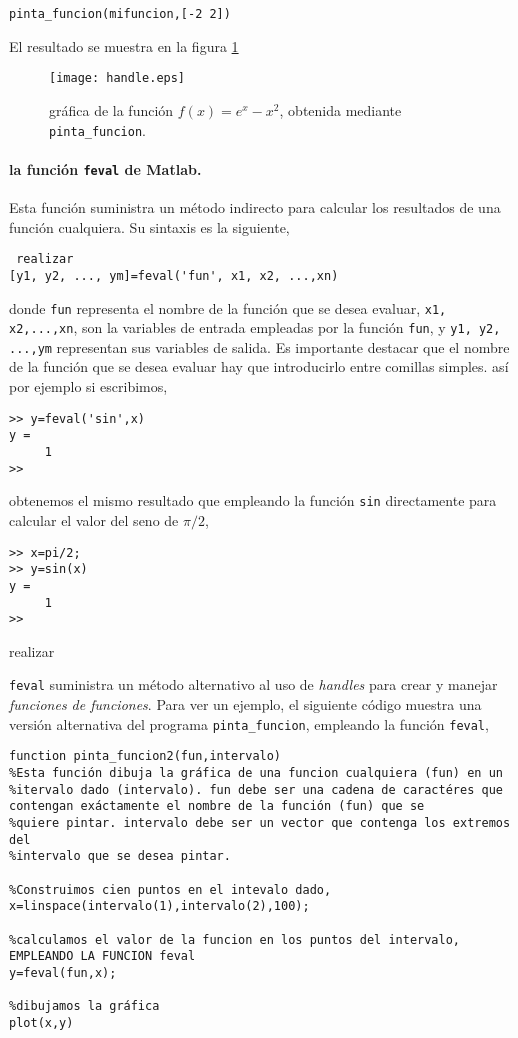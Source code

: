 \begin{verbatim}
pinta_funcion(mifuncion,[-2 2])
\end{verbatim} 

El resultado se muestra en la figura \ref{fig:handle}

\begin{figure}[h]
\centering
\texttt{[image: handle.eps]}
\caption{gráfica de la función $f(x)=e^x-x^2$, obtenida mediante \texttt{pinta\_funcion}.}
\label{fig:handle}
\end{figure}

\paragraph{la función \texttt{feval} de Matlab.} Esta función suministra un método indirecto para calcular los resultados de una función cualquiera.  Su sintaxis es la siguiente,
\begin{verbatim} realizar 
[y1, y2, ..., ym]=feval('fun', x1, x2, ...,xn)
\end{verbatim}

donde \texttt{fun} representa el nombre de la función que se desea evaluar, \texttt{x1, x2,...,xn}, son la variables de entrada empleadas por la función \texttt{fun}, y \texttt{y1, y2, ...,ym} representan sus variables de salida. Es importante destacar que el nombre de la función que se desea evaluar hay que introducirlo entre comillas simples. así por ejemplo si escribimos,

 \begin{verbatim}
>> y=feval('sin',x)
y =
     1
>> 
\end{verbatim}
obtenemos el mismo resultado que empleando la función \texttt{sin} directamente para calcular  el valor del seno de $\pi/2$,
\begin{verbatim}
>> x=pi/2;
>> y=sin(x)
y =
     1
>> 
\end{verbatim}
 realizar 



\texttt{feval} suministra un método alternativo al uso de \emph{handles} para crear y manejar \emph{funciones de funciones}. Para ver un ejemplo, el siguiente código muestra una versión alternativa del programa \texttt{pinta\_funcion}, empleando la función \texttt{feval},

\begin{verbatim}
function pinta_funcion2(fun,intervalo)
%Esta función dibuja la gráfica de una funcion cualquiera (fun) en un
%itervalo dado (intervalo). fun debe ser una cadena de caractéres que contengan exáctamente el nombre de la función (fun) que se 
%quiere pintar. intervalo debe ser un vector que contenga los extremos del
%intervalo que se desea pintar.

%Construimos cien puntos en el intevalo dado,
x=linspace(intervalo(1),intervalo(2),100);

%calculamos el valor de la funcion en los puntos del intervalo, EMPLEANDO LA FUNCION feval
y=feval(fun,x);

%dibujamos la gráfica
plot(x,y)
\end{verbatim}

